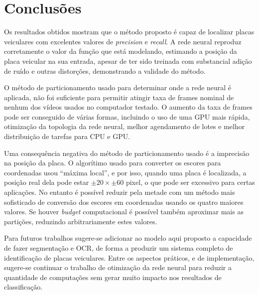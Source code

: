 
\chapter{Conclusões}

Os resultados obtidos mostram que o método proposto é capaz de localizar placas
veiculares com excelentes valores de \emph{precision} e \emph{recall}.  
A rede neural reproduz corretamente o valor da função
que está modelando, estimando a posição da placa veicular na sua
entrada, apesar de ter sido treinada com substancial adição de ruído e outras
distorções, demonstrando a validade do método.

O método de particionamento usado para determinar onde a rede neural é
aplicada, não foi suficiente para permitir atingir taxa de frames
nominal de
nenhum dos vídeos usados no computador testado. O aumento da taxa de frames
pode ser conseguido de várias formas, incluindo o uso de uma GPU mais rápida,
otimização da topologia da rede neural, melhor agendamento de lotes e melhor
distribuição de tarefas para CPU e GPU.

Uma consequência negativa do método de particionamento usado
é a imprecisão na
posição da placa. O algorítimo usado para converter os escores para coordenadas
usou ``máxima local'', e por isso, quando uma placa é localizada, a posição real
dela pode estar $\pm 20 \times \pm 60$ pixel, o que pode ser excessivo para
certas aplicações. No entanto é possível reduzir pela metade com um método mais
sofisticado de conversão dos escores em coordenadas usando os quatro maiores
valores. Se houver \emph{budget} computacional é possível também
aproximar mais as partições, reduzindo arbitrariamente estes valores.

Para futuros trabalhos sugere-se adicionar ao modelo aqui proposto a
capacidade de fazer segmentação e OCR, de forma a produzir um sistema completo
de identificação de placas veiculares. Entre os aspectos práticos, e de
implementação, sugere-se continuar o trabalho de otimização da rede
neural para reduzir a quantidade de computações sem gerar muito impacto nos
resultados de classificação.
